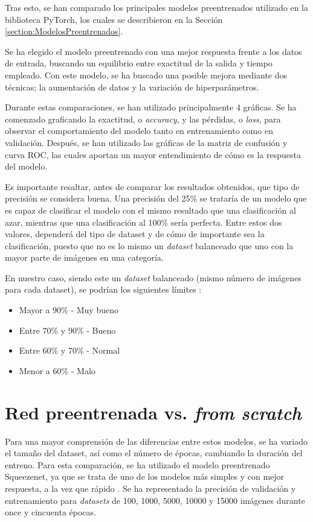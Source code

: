 \documentclass{report}
\begin{document}
Tras esto, se han comparado los principales modelos preentrenados utilizado en la biblioteca PyTorch, los cuales se describieron en la Sección \ref{section:ModelosPreentrenados}. 

Se ha elegido el modelo preentrenado con una mejor respuesta frente a los datos de entrada, buscando un equilibrio entre exactitud de la salida y tiempo empleado. Con este modelo, se ha buscado una posible mejora mediante dos técnicas; la aumentación de datos y la variación de hiperparámetros.

Durante estas comparaciones, se han utilizado principalmente 4 gráficas. Se ha comenzado graficando la exactitud, o \textit{accuracy}, y las pérdidas, o \textit{loss}, para observar el comportamiento del modelo tanto en entrenamiento como en validación. Después, se han utilizado las gráficas de la matriz de confusión y curva ROC, las cuales aportan un mayor entendimiento de cómo es la respuesta del modelo.


Es importante resaltar, antes de comparar los resultados obtenidos, que tipo de precisión se considera buena. Una precisión del 25\% se trataría de un modelo que es capaz de clasificar el modelo con el mismo resultado que una clasificación al azar, mientras que una clasificación al 100\% sería perfecta. Entre estos dos valores, dependerá del tipo de dataset y de cómo de importante sea la clasificación, puesto que no es lo mismo un \textit{dataset} balanceado que uno con la mayor parte de imágenes en una categoría. 


En nuestro caso, siendo este un \textit{dataset} balanceado (mismo número de imágenes para cada dataset), se podrían los siguientes límites \cite{PrecisionBuena}:

\begin{itemize}
    \item Mayor a 90\% - Muy bueno
    \item Entre 70\% y 90\% - Bueno
    \item Entre 60\% y 70\% - Normal
    \item Menor a 60\% - Malo
\end{itemize}




   
\section{Red preentrenada vs. \textit{from scratch}}

Para una mayor comprensión de las diferencias entre estos modelos, se ha variado el tamaño del dataset, así como el número de épocas, cambiando la duración del entreno. Para esta comparación, se ha utilizado el modelo preentrenado Squeezenet, ya que se trata de uno de los modelos más simples y con mejor respuesta, a la vez que rápido \cite{SqueezeNetPaper} \cite{SqueezenetBetter2}. Se ha representado la precisión de validación y entrenamiento para \textit{datasets} de 100, 1000, 5000, 10000 y 15000 imágenes durante once y cincuenta épocas.
\end{document}
